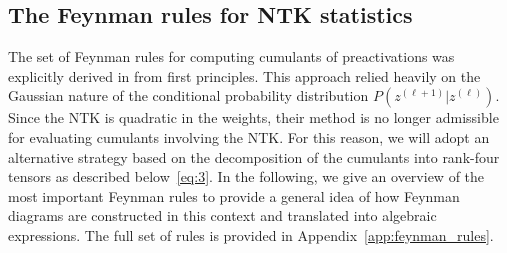 \subsection{The Feynman rules for NTK statistics}\label{sec:feynman-rules}
The set of Feynman rules for computing cumulants of preactivations was explicitly derived in \cite{banta2024} from first principles. This approach relied heavily on the Gaussian nature of the conditional probability distribution $P(z^{(\ell+1)}|z^{(\ell)})$. Since the NTK is quadratic in the weights, their method is no longer admissible for evaluating cumulants involving the NTK. For this reason, we will adopt an alternative strategy based on the decomposition of the cumulants into rank-four tensors as described below~\eqref{eq:3}. In the following, we give an overview of the most important Feynman rules to provide a general idea of how Feynman diagrams are constructed in this context and translated into algebraic expressions. The full set of rules is provided in Appendix~\ref{app:feynman_rules}.



